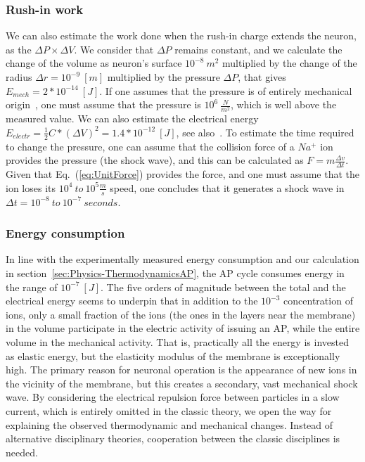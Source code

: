 \subsubsection[Rush-in work]{Rush-in work\label{sec:Physics-RushInWork}}
{ %
	We can also estimate the work done when the rush-in charge
	extends the neuron, as the $\Delta P\times\Delta V$. We consider that $\Delta P$ remains constant, and we calculate the change of the volume as neuron's surface $10^{-8}\ m^2$ multiplied by 
	the change of the radius $\Delta r=10^{-9}\ [m]$ multiplied by the pressure $\Delta P$, that gives $E_{mech}=2*10^{-14}\ [J]$.
	If one assumes that the pressure is of entirely mechanical origin~\cite{NeuronalDeformation:2020}, one must assume that the 
	pressure is $10^6~\frac{N}{m^2}$, which is well above the measured value.
	We can also estimate the electrical energy $E_{electr}=\frac{1}{2} C*(\Delta V)^2 = 1.4*10^{-12}\ [J]$, see also~\cite{EnergyNeuralCommunication:2021}.
	To estimate the time required to change the pressure, one can assume that the collision force of a $Na^+$ ion provides the pressure (the shock wave), and this can be calculated as $F = m\frac{\Delta v}{\Delta t}$. Given that Eq.~(\ref{eq:UnitForce})  provides the force, and one must assume that the ion loses its 
	$10^4~to~10^5\frac{m}{s}$ speed, one concludes that it generates a shock wave in $\Delta t = 10^{-8}~to~10^{-7}~seconds$.
	}
	
\subsubsection{Energy consumption\label{sec:Physics-EnergyConsumption}}

	In line with the experimentally measured energy consumption and our calculation in section~\ref{sec:Physics-ThermodynamicsAP},
	the \gls{AP} cycle consumes energy in the range of $10^{-7}\ [J]$. 
	The five orders of magnitude between the total and the electrical energy
	seems to underpin that in addition to the $10^{-3}$ concentration of ions,
	only a small fraction of the ions (the ones in the layers near the membrane) in the volume participate in the electric activity of issuing an \gls{AP}, while the entire volume in the mechanical activity.
	That is, practically all the energy is invested as elastic energy, but the elasticity modulus of the membrane is exceptionally high.
	The primary reason for neuronal operation is the appearance of new ions in the vicinity of the membrane, but this creates a secondary, vast mechanical shock wave. By considering the electrical repulsion force between particles in a slow current, which is entirely omitted in the classic theory, we open the way for explaining the observed thermodynamic and mechanical changes. Instead of alternative disciplinary theories, cooperation between the classic disciplines is needed.


